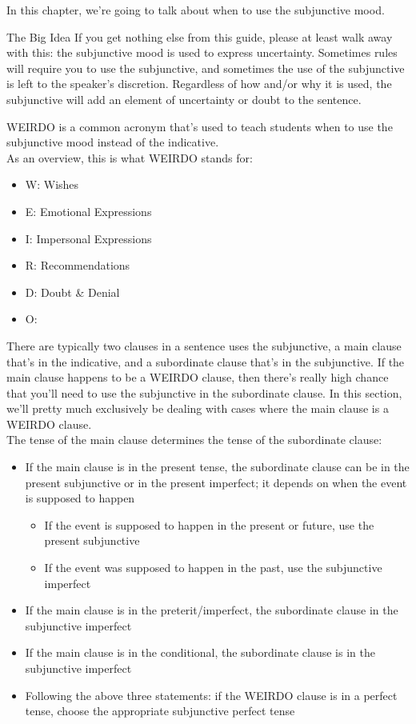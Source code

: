 \label{sec:weirdo}
In this chapter, we're going to talk about when to use the subjunctive mood. 


\begin{conf}{The Big Idea}
If you get nothing else from this guide, please at least walk away with this: the subjunctive mood is used to express uncertainty. Sometimes rules will require you to use the subjunctive, and sometimes the use of the subjunctive is left to the speaker's discretion. Regardless of how and/or why it is used, the subjunctive will add an element of uncertainty or doubt to the sentence. 
\end{conf}

 WEIRDO is a common acronym that's used to teach students when to use the subjunctive mood instead of the indicative. \\ 

As an overview, this is what WEIRDO stands for:
\begin{itemize}[noitemsep]
	\item W: Wishes
	\item E: Emotional Expressions
	\item I: Impersonal Expressions
	\item R: Recommendations
	\item D: Doubt \& Denial
	\item O: 
\end{itemize}

There are typically two clauses in a sentence uses the subjunctive, a main clause that's in the indicative, and a subordinate clause that's in the subjunctive. If the main clause happens to be a WEIRDO clause, then there's really high chance that you'll need to use the subjunctive in the subordinate clause. In this section, we'll pretty much exclusively be dealing with cases where the main clause is a WEIRDO clause. \\

The tense of the main clause determines the tense of the subordinate clause: 
\begin{itemize}[noitemsep]
	\item If the main clause is in the present tense, the subordinate clause can be in the present subjunctive or in the present imperfect; it depends on when the event is supposed to happen
		\begin{itemize}[noitemsep]
			\item If the event is supposed to happen in the present or future, use the present subjunctive
			\item If the event was supposed to happen in the past, use the subjunctive imperfect
		\end{itemize}
	\item If the main clause is in the preterit/imperfect, the subordinate clause in the subjunctive imperfect
	\item If the main clause is in the conditional, the subordinate clause is in the subjunctive imperfect
	\item Following the above three statements: if the WEIRDO clause is in a perfect tense, choose the appropriate subjunctive perfect tense
\end{itemize}

